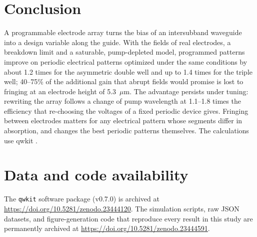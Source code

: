 \documentclass[11pt]{article}
\newcommand{\um}{~$\mu$m}
\begin{document}
\section{Conclusion}
A programmable electrode array turns the bias of an intersubband waveguide into a design variable along the guide. With the fields of real electrodes, a breakdown limit and a saturable, pump-depleted model, programmed patterns improve on periodic electrical patterns optimized under the same conditions by about 1.2 times for the asymmetric double well and up to 1.4 times for the triple well; 40--75\% of the additional gain that abrupt fields would promise is lost to fringing at an electrode height of 5.3\um. The advantage persists under tuning: rewriting the array follows a change of pump wavelength at 1.1--1.8 times the efficiency that re-choosing the voltages of a fixed periodic device gives. Fringing between electrodes matters for any electrical pattern whose segments differ in absorption, and changes the best periodic patterns themselves. The calculations use qwkit \cite{qwkit}.

\section*{Data and code availability}
The \texttt{qwkit} software package (v0.7.0) is archived at \url{https://doi.org/10.5281/zenodo.23444120}. The simulation scripts, raw JSON datasets, and figure-generation code that reproduce every result in this study are permanently archived at \url{https://doi.org/10.5281/zenodo.23444591}.



\end{document}
